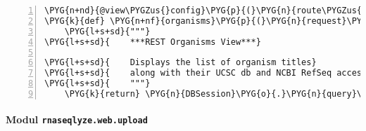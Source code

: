 \begin{Verbatim}[commandchars=\\\{\},numbers=left,firstnumber=1,stepnumber=5]
\PYG{n+nd}{@view\PYGZus{}config}\PYG{p}{(}\PYG{n}{route\PYGZus{}name}\PYG{o}{=}\PYG{l+s}{'}\PYG{l+s}{organisms\PYGZus{}rest}\PYG{l+s}{'}\PYG{p}{,} \PYG{n}{renderer}\PYG{o}{=}\PYG{l+s}{'}\PYG{l+s}{jsonx}\PYG{l+s}{'}\PYG{p}{)}
\PYG{k}{def} \PYG{n+nf}{organisms}\PYG{p}{(}\PYG{n}{request}\PYG{p}{)}\PYG{p}{:}
    \PYG{l+s+sd}{"""}
\PYG{l+s+sd}{    ***REST Organisms View***}

\PYG{l+s+sd}{    Displays the list of organism titles}
\PYG{l+s+sd}{    along with their UCSC db and NCBI RefSeq accession identifiers}
\PYG{l+s+sd}{    """}
    \PYG{k}{return} \PYG{n}{DBSession}\PYG{o}{.}\PYG{n}{query}\PYG{p}{(}\PYG{n}{UCSCOrganism}\PYG{p}{)}\PYG{o}{.}\PYG{n}{all}\PYG{p}{(}\PYG{p}{)}
\end{Verbatim}


\paragraph{Modul \texttt{rnaseqlyze.web.upload}}
\label{rnaseqlyze-pdf:modul-rnaseqlyze-web-upload}
